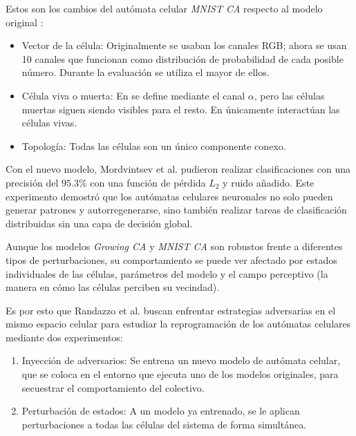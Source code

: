Estos son los cambios del autómata celular \textit{MNIST CA} respecto al modelo original \cite{mordvintsevNCA}:

\begin{itemize}
	
	\item Vector de la célula: Originalmente se usaban los canales RGB; ahora se usan 10 canales que funcionan como distribución de probabilidad de cada posible número. Durante la evaluación se utiliza el mayor de ellos.
	
	
	
	\item Célula viva o muerta: En \cite{mordvintsevNCA} se define mediante el canal $\alpha$, pero las células muertas siguen siendo visibles para el resto. En \cite{MNIST}  únicamente interactúan las células vivas.
	
	
	
	\item Topología: Todas las células son un único componente conexo.
	
\end{itemize}

Con el nuevo modelo, Mordvintsev et al. pudieron realizar clasificaciones con una precisión del $95.3\%$ con una función de pérdida $L_2$ y ruido añadido. Este experimento demostró que los autómatas celulares neuronales no solo pueden generar patrones y autorregenerarse, sino también realizar tareas de clasificación distribuidas sin una capa de decisión global.

Aunque los modelos \textit{Growing CA} y \textit{MNIST CA} son robustos frente a diferentes tipos de perturbaciones, su comportamiento se puede ver afectado por estados individuales de las células, parámetros del modelo y el campo perceptivo (la manera en cómo las células perciben su vecindad).

Es por esto que Randazzo et al. \cite{randazzoNCA} buscan enfrentar estrategias adversarias en el mismo espacio celular para estudiar la reprogramación de los autómatas celulares mediante dos experimentos:

\begin{enumerate}
	
	\item Inyección de adversarios: Se entrena un nuevo modelo de autómata celular, que se coloca en el entorno que ejecuta uno de los modelos originales, para secuestrar el comportamiento del colectivo.
	
	
	
	\item Perturbación de estados: A un modelo ya entrenado, se le aplican perturbaciones a todas las células del sistema de forma simultánea.
	
\end{enumerate}

